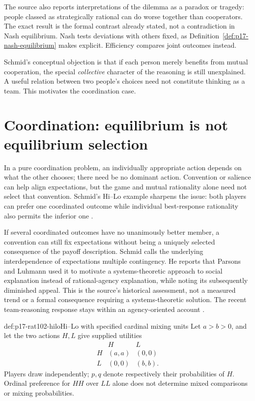 The source also reports interpretations of the dilemma as a paradox or
tragedy: people classed as strategically rational can do worse together
than cooperators. The exact result is the formal contrast already stated,
not a contradiction in Nash equilibrium. Nash tests deviations with others
fixed, as Definition~\ref{def:p17-nash-equilibrium} makes explicit.
Efficiency compares joint outcomes instead.

Schmid's conceptual objection is that if each person merely benefits from
mutual cooperation, the special \emph{collective} character of the reasoning
is still unexplained. A useful relation between two people's choices need
not constitute thinking as a team. This motivates the coordination case.

\section{Coordination: equilibrium is not equilibrium selection}
\label{sec:p17-rat102-coordination}

In a pure coordination problem, an individually appropriate action depends
on what the other chooses; there need be no dominant action. Convention or
salience can help align expectations, but the game and mutual rationality
alone need not select that convention. Schmid's Hi--Lo example sharpens
the issue: both players can prefer one coordinated outcome while individual
best-response rationality also permits the inferior one
\parencite[pp.~593--594]{Schmid2021CollectiveRationality}.

If several coordinated outcomes have no unanimously better member, a
convention can still fix expectations without being a uniquely selected
consequence of the payoff description. Schmid calls the underlying
interdependence of expectations multiple contingency. He reports that
Parsons and Luhmann used it to motivate a systems-theoretic approach to
social explanation instead of rational-agency explanation, while noting
its subsequently diminished appeal. This is the source's historical
assessment, not a measured trend or a formal consequence requiring a
systems-theoretic solution. The recent team-reasoning response stays
within an agency-oriented account
\parencite[pp.~593--594]{Schmid2021CollectiveRationality}.

\begin{hbdefinition}{def:p17-rat102-hilo}{Hi--Lo with specified cardinal mixing units}
Let \(a>b>0\), and let the two actions \(H,L\) give supplied utilities
\[
 \begin{array}{c|cc}
      &H&L\\ \hline
 H&(a,a)&(0,0)\\
 L&(0,0)&(b,b).
 \end{array}
\]
Players draw independently; \(p,q\) denote respectively their probabilities
of \(H\). Ordinal preference for \(HH\) over \(LL\) alone does not
determine mixed comparisons or mixing probabilities.
\end{hbdefinition}

